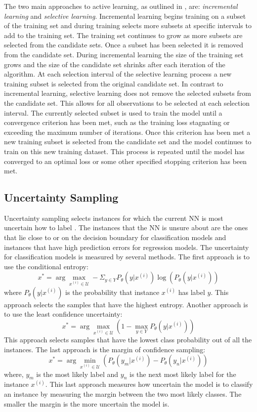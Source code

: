 \documentclass[conference]{IEEEtran}
\begin{document}
	The two main approaches to active learning, as outlined in \cite{engelbrecht2001}, are: \textit{incremental learning} and \textit{selective learning}. Incremental learning begins training on a subset of the training set and during training selects more subsets at specific intervals to add to the training set. The training set continues to grow as more subsets are selected from the candidate sets. Once a subset has been selected it is removed from the candidate set. During incremental learning the size of the training set grows and the size of the candidate set shrinks after each iteration of the algorithm. At each selection interval of the selective learning process a new training subset is selected from the original candidate set. In contrast to incremental learning, selective learning does not remove the selected subsets from the candidate set. This allows for all observations to be selected at each selection interval. The currently selected subset is used to train the model until a convergence criterion has been met, such as the training loss stagnating or exceeding the maximum number of iterations. Once this criterion has been met a new training subset is selected from the candidate set and the model continues to train on this new training dataset. This process is repeated until the model has converged to an optimal loss or some other specified stopping criterion has been met.
	
	\subsection{Uncertainty Sampling}
	Uncertainty sampling selects instances for which the current NN is most uncertain how to label \cite{lewis1994sequential}. The instances that the NN is unsure about are the ones that lie close to or on the decision boundary for classification models and instances that have high prediction errors for regression models. The uncertainty for classification models is measured by several methods. The first approach is to use the conditional entropy:
	$$
	x^*=\arg \max_{x^{(i)} \in \mathcal{U}} -\Sigma_{y\in Y}P_\theta(y \lvert x^{(i)})\log(P_\theta(y \lvert x^{(i)}))
	$$
	where $P_\theta(y \lvert x^{(i)})$ is the probability that instance $x^{(i)}$ has label $y$. This approach selects the samples that have the highest entropy. 
	Another approach is to use the least confidence uncertainty:
	$$
	x^*=\arg \max_{x^{(i)} \in \mathcal{U}} (1-\max_{y\in Y}P_\theta(y \lvert x^{(i)}))
	$$
	This approach selects samples that  have the lowest class probability out of all the instances.
	The last approach is the margin of confidence sampling:
	$$
	x^*=\arg \min_{x^{(i)} \in \mathcal{U}} (P_\theta(y_m \lvert x^{(i)}) - P_\theta(y_n \lvert x^{(i)}))
	$$
	where, $y_m$ is the most likely label and $y_n$ is the next most likely label for the instance $x^{(i)}$. This last approach measures how uncertain the model is to classify an instance by measuring the margin between the two most likely classes. The smaller the margin is the more uncertain the model is.
	
\end{document}
